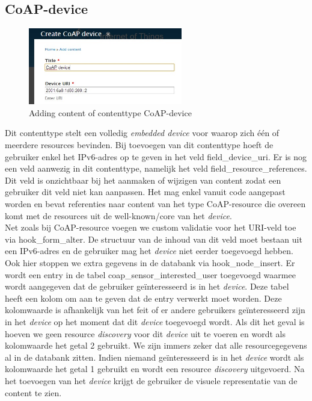 \subsection{CoAP-device}
\begin{figure}
\vspace{-10pt}
\centering
\label{fig:addCoapDevice}
\includegraphics[width=0.6\textwidth]{fig/add_coap_device}
\vspace{-20pt}
\centering
\caption{Adding content of contenttype CoAP-device}
\centering
\vspace{-20pt}
\end{figure}
Dit contenttype stelt een volledig \textit{embedded device} voor waarop zich \'{e}\'{e}n of meerdere resources bevinden. Bij toevoegen van dit contenttype hoeft de gebruiker enkel het IPv6-adres op te geven in het veld field\_device\_uri. Er is nog een veld aanwezig in dit contenttype, namelijk het veld field\_resource\_references. Dit veld is onzichtbaar bij het aanmaken of wijzigen van content zodat een gebruiker dit veld niet kan aanpassen. Het mag enkel vanuit code aangepast worden en bevat referenties naar content van het type CoAP-resource die overeen komt met de resources uit de well-known/core van het \textit{device}.\\

Net zoals bij CoAP-resource voegen we custom validatie voor het URI-veld toe via hook\_form\_alter. De structuur van de inhoud van dit veld moet bestaan uit een IPv6-adres en de gebruiker mag het \textit{device} niet eerder toegevoegd hebben. Ook hier stoppen we extra gegevens in de databank via hook\_node\_insert. Er wordt een entry in de tabel coap\_sensor\_interested\_user toegevoegd waarmee wordt aangegeven dat de gebruiker ge\"{i}nteresseerd is in het \textit{device}. Deze tabel heeft een kolom om aan te geven dat de entry verwerkt moet worden. Deze kolomwaarde is afhankelijk van het feit of er andere gebruikers ge\"{i}nteresseerd zijn in het \textit{device} op het moment dat dit \textit{device} toegevoegd wordt. Als dit het geval is hoeven we geen resource \textit{discovery} voor dit \textit{device} uit te voeren en wordt als kolomwaarde het getal 2 gebruikt. We zijn immers zeker dat alle resourcegegevens al in de databank zitten. Indien niemand ge\"{i}nteresseerd is in het \textit{device} wordt als kolomwaarde het getal 1 gebruikt en wordt een resource \textit{discovery} uitgevoerd. Na het toevoegen van het \textit{device} krijgt de gebruiker de visuele representatie van de content te zien.\\

